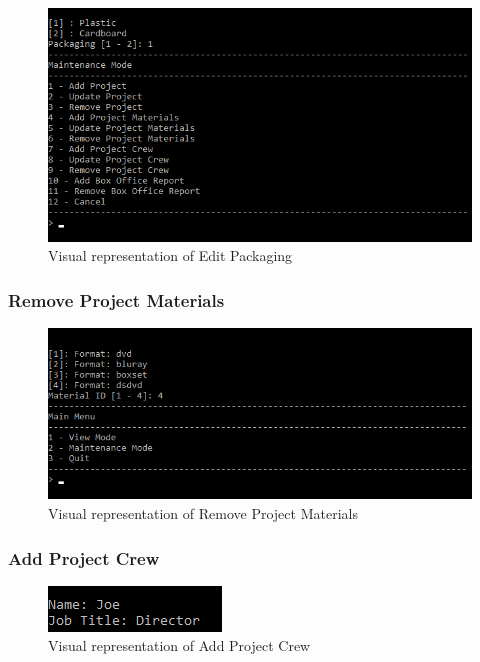 \documentclass[
  english,
  a4paper,
,tablecaptionabove
]{scrartcl}
\begin{document}
\begin{figure}
\centering
\includegraphics{images/ui-screenshots/update-project-material-packaging.png}
\caption{Visual representation of Edit Packaging}
\end{figure}

\newpage

\hypertarget{remove-project-materials}{%
\subsubsection{Remove Project
Materials}\label{remove-project-materials}}

\begin{figure}
\centering
\includegraphics{images/ui-screenshots/remove-project-materials.png}
\caption{Visual representation of Remove Project Materials}
\end{figure}

\newpage

\hypertarget{add-project-crew}{%
\subsubsection{Add Project Crew}\label{add-project-crew}}

\begin{figure}
\centering
\includegraphics{images/ui-screenshots/add-crew.png}
\caption{Visual representation of Add Project Crew}
\end{figure}
\end{document}

